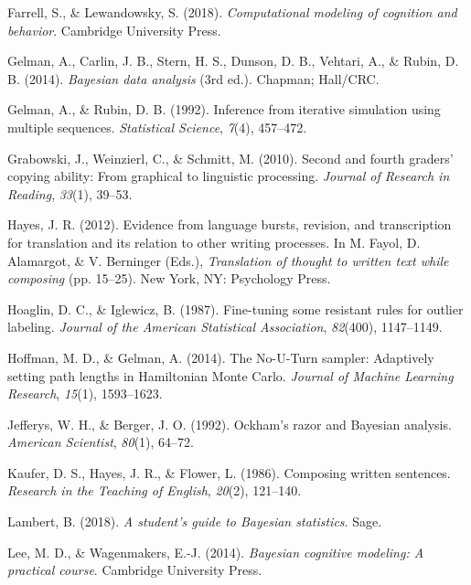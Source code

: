 \documentclass[
  english,
  man,mask,floatsintext]{apa7}
\newlength{\cslhangindent}
\newenvironment{cslreferences}%
  {\setlength{\parindent}{0pt}%
  \everypar{\setlength{\hangindent}{\cslhangindent}}\ignorespaces}%
  {\par}
\begin{document}
\begin{cslreferences}
\leavevmode\hypertarget{ref-farrell2018computational}{}%
Farrell, S., \& Lewandowsky, S. (2018). \emph{Computational modeling of cognition and behavior}. Cambridge University Press.

\leavevmode\hypertarget{ref-gelman2014}{}%
Gelman, A., Carlin, J. B., Stern, H. S., Dunson, D. B., Vehtari, A., \& Rubin, D. B. (2014). \emph{Bayesian data analysis} (3rd ed.). Chapman; Hall/CRC.

\leavevmode\hypertarget{ref-gelman1992}{}%
Gelman, A., \& Rubin, D. B. (1992). Inference from iterative simulation using multiple sequences. \emph{Statistical Science}, \emph{7}(4), 457--472.

\leavevmode\hypertarget{ref-grabowski2010second}{}%
Grabowski, J., Weinzierl, C., \& Schmitt, M. (2010). Second and fourth graders' copying ability: From graphical to linguistic processing. \emph{Journal of Research in Reading}, \emph{33}(1), 39--53.

\leavevmode\hypertarget{ref-hayes2012evidence}{}%
Hayes, J. R. (2012). Evidence from language bursts, revision, and transcription for translation and its relation to other writing processes. In M. Fayol, D. Alamargot, \& V. Berninger (Eds.), \emph{Translation of thought to written text while composing} (pp. 15--25). New York, NY: Psychology Press.

\leavevmode\hypertarget{ref-hoaglin1987fine}{}%
Hoaglin, D. C., \& Iglewicz, B. (1987). Fine-tuning some resistant rules for outlier labeling. \emph{Journal of the American Statistical Association}, \emph{82}(400), 1147--1149.

\leavevmode\hypertarget{ref-hoffman2014no}{}%
Hoffman, M. D., \& Gelman, A. (2014). The No-U-Turn sampler: Adaptively setting path lengths in Hamiltonian Monte Carlo. \emph{Journal of Machine Learning Research}, \emph{15}(1), 1593--1623.

\leavevmode\hypertarget{ref-jefferys1992ockham}{}%
Jefferys, W. H., \& Berger, J. O. (1992). Ockham's razor and Bayesian analysis. \emph{American Scientist}, \emph{80}(1), 64--72.

\leavevmode\hypertarget{ref-kaufer1986composing}{}%
Kaufer, D. S., Hayes, J. R., \& Flower, L. (1986). Composing written sentences. \emph{Research in the Teaching of English}, \emph{20}(2), 121--140.

\leavevmode\hypertarget{ref-lambert2018student}{}%
Lambert, B. (2018). \emph{A student's guide to Bayesian statistics}. Sage.

\leavevmode\hypertarget{ref-lee2014bayesian}{}%
Lee, M. D., \& Wagenmakers, E.-J. (2014). \emph{Bayesian cognitive modeling: A practical course}. Cambridge University Press.


\end{cslreferences}
\end{document}
